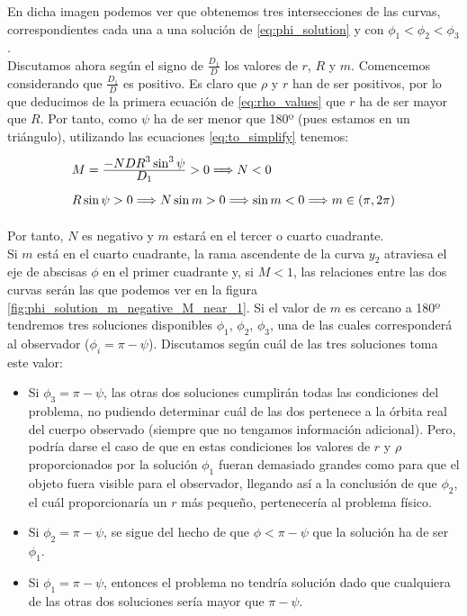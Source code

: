 \documentclass[11pt]{article}
\newcommand\ddfrac[2]{\frac{\displaystyle #1}{\displaystyle #2}}
\begin{document}
En dicha imagen podemos ver que obtenemos tres intersecciones de las curvas, correspondientes cada una a una solución de \eqref{eq:phi_solution} y con $\phi_1<\phi_2<\phi_3$.\\

Discutamos ahora según el signo de $\frac{D_1}{D}$ los valores de $r$, $R$ y $m$. Comencemos considerando que $\frac{D_1}{D}$ es positivo. Es claro que $\rho$ y $r$ han de ser positivos, por lo que deducimos de la primera ecuación de \eqref{eq:rho_values} que $r$ ha de ser mayor que $R$. Por tanto, como $\psi$ ha de ser menor que 180º (pues estamos en un triángulo), utilizando las ecuaciones \eqref{eq:to_simplify} tenemos:
\[
\def\arraystretch{2}
\begin{array}{l}
M=\ddfrac{-NDR^3\sin^3{\psi}}{D_1}>0 \Longrightarrow N<0 \\
R\sin{\psi}>0 \Longrightarrow N\sin{m}>0 \Longrightarrow \sin{m}<0 \Longrightarrow m\in(\pi,2\pi)
\end{array}
\]

Por tanto, $N$ es negativo y $m$ estará en el tercer o cuarto cuadrante.\\

Si $m$ está en el cuarto cuadrante, la rama ascendente de la curva $y_2$ atraviesa el eje de abscisas $\phi$ en el primer cuadrante y, si $M<1$, las relaciones entre las dos curvas serán las que podemos ver en la figura \ref{fig:phi_solution_m_negative_M_near_1}. Si el valor de $m$ es cercano a 180º tendremos tres soluciones disponibles $\phi_1$, $\phi_2$, $\phi_3$, una de las cuales corresponderá al observador ($\phi_i=\pi-\psi$). Discutamos según cuál de las tres soluciones toma este valor:
\begin{itemize}
\item Si $\phi_3=\pi-\psi$, las otras dos soluciones cumplirán todas las condiciones del problema, no pudiendo determinar cuál de las dos pertenece a la órbita real del cuerpo observado (siempre que no tengamos información adicional). Pero, podría darse el caso de que en estas condiciones los valores de $r$ y $\rho$ proporcionados por la solución $\phi_1$ fueran demasiado grandes como para que el objeto fuera visible para el observador, llegando así a la conclusión de que $\phi_2$, el cuál proporcionaría un $r$ más pequeño, pertenecería al problema físico.
\item Si $\phi_2=\pi-\psi$, se sigue del hecho de que $\phi<\pi-\psi$ que la solución ha de ser $\phi_1$.
\item Si $\phi_1=\pi-\psi$, entonces el problema no tendría solución dado que cualquiera de las otras dos soluciones sería mayor que $\pi-\psi$.
\end{itemize} 
\end{document}

